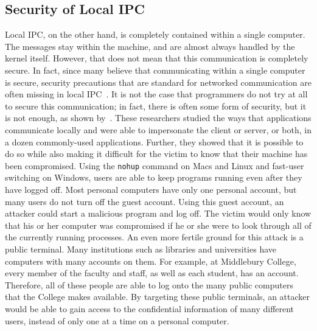 \subsection{Security of Local IPC}
\label{sec:localIPCSecurity}
Local IPC, on the other hand, is completely contained within a single computer.  The messages stay within the machine, and are almost always handled by the kernel itself.  However, that does not mean that this communication is completely secure.  In fact, since many believe that communicating within a single computer is secure, security precautions that are standard for networked communication are often missing in local IPC~\cite{MitMa}.  It is not the case that programmers do not try at all to secure this communication; in fact, there is often some form of security, but it is not enough, as shown by~\cite{MitMa}.  These researchers studied the ways that applications communicate locally and were able to impersonate the client or server, or both, in a dozen commonly-used applications.  Further, they showed that it is possible to do so while also making it difficult for the victim to know that their machine has been compromised.  Using the \texttt{nohup} command on Macs and Linux and fast-user switching on Windows, users are able to keep programs running even after they have logged off.  Most personal computers have only one personal account, but many users do not turn off the guest account.  Using this guest account, an attacker could start a malicious program and log off.  The victim would only know that his or her computer was compromised if he or she were to look through all of the currently running processes.  An even more fertile ground for this attack is a public terminal.  Many institutions such as libraries and universities have computers with many accounts on them.  For example, at Middlebury College, every member of the faculty and staff, as well as each student, has an account.  Therefore, all of these people are able to log onto the many public computers that the College makes available.  By targeting these public terminals, an attacker would be able to gain access to the confidential information of many different users, instead of only one at a time on a personal computer.


